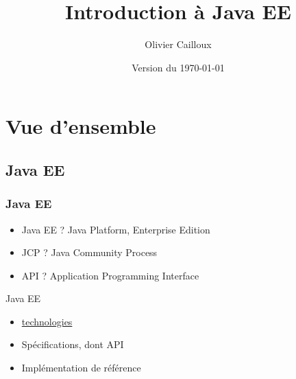 \documentclass[english, french]{beamer}
\title{Introduction à Java EE}
\author{Olivier Cailloux}
\institute[LAMSADE]{LAMSADE, Université Paris-Dauphine}
\date{Version du \today}
\begin{document}


\begin{frame}[plain]
   \titlepage
\end{frame}
\addtocounter{framenumber}{-1}

\section{Vue d’ensemble}
\subsection{Java EE}
\begin{frame}
	\frametitle{Java EE}
	\begin{itemize}
		\item Java EE ? \pause Java Platform, Enterprise Edition \pause
		\item JCP ? \pause Java Community Process \pause
		\item API ? \pause Application Programming Interface \pause
	\end{itemize}
	\begin{block}{Java EE}
		\begin{itemize}
			\item \href{http://www.oracle.com/technetwork/java/javaee/tech/index.html}{technologies}
			\item Spécifications, dont API
			\item Implémentation de référence
		\end{itemize}
	\end{block}
\end{frame}
\end{document}
